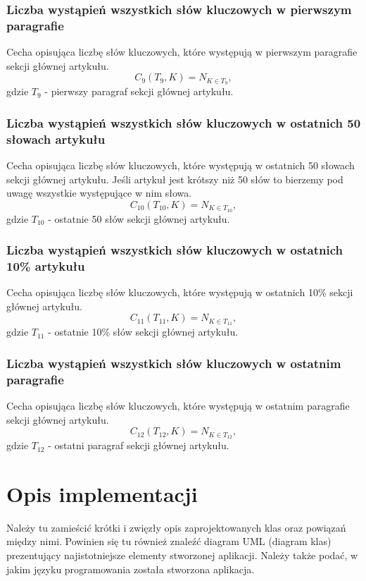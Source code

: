 \documentclass{classrep}
\begin{document}
\subsubsection{Liczba wystąpień wszystkich słów kluczowych w pierwszym paragrafie}
Cecha opisująca liczbę słów kluczowych, które występują w pierwszym paragrafie sekcji głównej artykułu.
\begin{equation}
            C_{9}(T_{9},K) = N_{K \in T_{9}},
 \end{equation}	
 gdzie $T_{9}$ - pierwszy paragraf sekcji głównej artykułu.

\subsubsection{Liczba wystąpień wszystkich słów kluczowych w ostatnich 50 słowach artykułu}
Cecha opisująca liczbę słów kluczowych, które występują w ostatnich 50 słowach sekcji głównej artykułu. Jeśli artykuł jest krótszy niż 50 słów to bierzemy pod uwagę wszystkie występujące w nim słowa.
\begin{equation}
            C_{10}(T_{10},K) = N_{K \in T_{10}},
 \end{equation}	
 gdzie $T_{10}$ - ostatnie 50 słów sekcji głównej artykułu.

\subsubsection{Liczba wystąpień wszystkich słów kluczowych w ostatnich 10\% artykułu}
Cecha opisująca liczbę słów kluczowych, które występują w ostatnich 10\% sekcji głównej artykułu.
\begin{equation}
            C_{11}(T_{11},K) = N_{K \in T_{11}},
 \end{equation}	
 gdzie $T_{11}$ - ostatnie 10\% słów sekcji głównej artykułu.

\subsubsection{Liczba wystąpień wszystkich słów kluczowych w ostatnim paragrafie}
Cecha opisująca liczbę słów kluczowych, które występują w ostatnim paragrafie sekcji głównej artykułu.
\begin{equation}
            C_{12}(T_{12},K) = N_{K \in T_{12}},
 \end{equation}	
 gdzie $T_{12}$ - ostatni paragraf sekcji głównej artykułu.

\section{Opis implementacji}
{\color{blue}
Należy tu zamieścić krótki i zwięzły opis zaprojektowanych klas oraz powiązań
między nimi. Powinien się tu również znaleźć diagram UML  (diagram klas)
prezentujący najistotniejsze elementy stworzonej aplikacji. Należy także
podać, w jakim języku programowania została stworzona aplikacja. }
\end{document}
